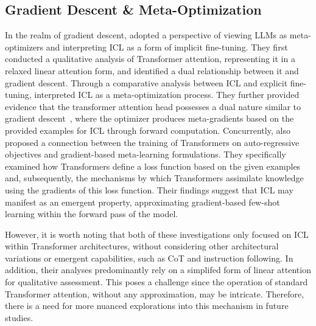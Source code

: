 \subsection{Gradient Descent \& Meta-Optimization}
In the realm of gradient descent, \citet{Dai2023WhyCG} adopted a perspective of viewing LLMs as meta-optimizers and interpreting ICL as a form of implicit fine-tuning. 
They first conducted a qualitative analysis of Transformer attention, representing it in a relaxed linear attention form, and identified a dual relationship between it and gradient descent. 
Through a comparative analysis between ICL and explicit fine-tuning, \citet{Dai2023WhyCG} interpreted ICL as a meta-optimization process. They further provided evidence that the transformer attention head possesses a dual nature similar to gradient descent~\cite{Irie2022TheDF}, where the optimizer produces meta-gradients based on the provided examples for ICL through forward computation.
Concurrently, \citet{Oswald2022TransformersLI} also proposed a connection between the training of Transformers on auto-regressive objectives and gradient-based meta-learning formulations. 
They specifically examined how Transformers define a loss function based on the given examples and, subsequently, the mechanisms by which Transformers assimilate knowledge using the gradients of this loss function. 
Their findings suggest that ICL may manifest as an emergent property, approximating gradient-based few-shot learning within the forward pass of the model.

However, it is worth noting that both of these investigations only focused on ICL within Transformer architectures, without considering other architectural variations or emergent capabilities, such as CoT and instruction following.
In addition, their analyses predominantly rely on a simplifed form of linear attention for qualitative assessment. 
This poses a challenge since the operation of standard Transformer attention, without any approximation, may be intricate. Therefore, there is a need for  more nuanced explorations into this mechanism in future studies.

